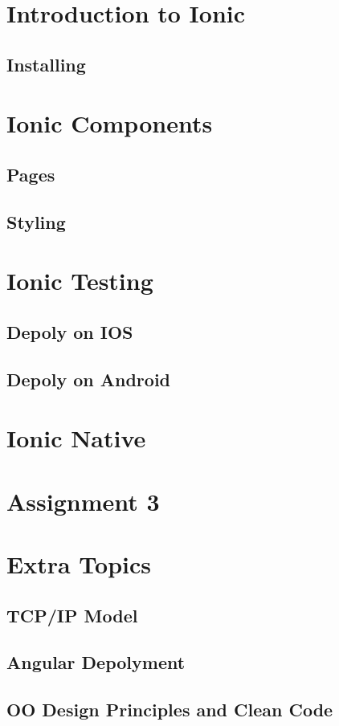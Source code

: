 \documentclass[a4paper]{article}
\begin{document}
\section{Introduction to Ionic}
\subsection{Installing}

\section{Ionic Components}
\subsection{Pages}

\subsection{Styling}

\section{Ionic Testing}
\subsection{Depoly on IOS}
\subsection{Depoly on Android}
\section{Ionic Native}

\section{Assignment 3}

\section{Extra Topics}
\subsection{TCP/IP Model}
\subsection{Angular Depolyment}
\subsection{OO Design Principles and Clean Code}
\end{document}
